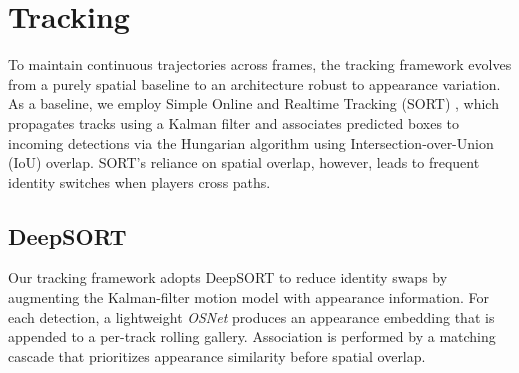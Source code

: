 \section{Tracking}\label{sec:tracking}

To maintain continuous trajectories across frames, the tracking framework evolves from a purely spatial baseline to an architecture robust to appearance variation.
As a baseline, we employ Simple Online and Realtime Tracking (SORT) \cite{sort}, which propagates tracks using a Kalman filter and associates predicted boxes to incoming detections via the Hungarian algorithm using Intersection-over-Union (IoU) overlap.
SORT's reliance on spatial overlap, however, leads to frequent identity switches when players cross paths.




\subsection{DeepSORT}
Our tracking framework adopts DeepSORT \cite{deepsort} to reduce identity swaps by augmenting the Kalman-filter motion model with appearance information.
For each detection, a lightweight \emph{OSNet} \cite{reid} produces an appearance embedding that is appended to a per-track rolling gallery.
Association is performed by a matching cascade that prioritizes appearance similarity before spatial overlap.


